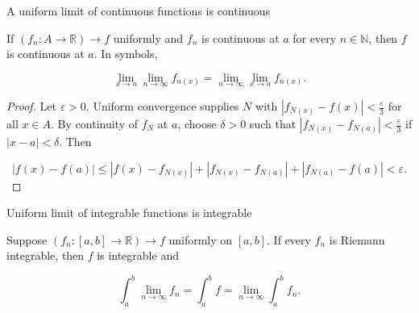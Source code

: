 \begin{theorem}{A uniform limit of continuous functions is continuous}

If \(\left( {f_{n}:A\rightarrow\mathbb{R}} \right)\rightarrow f\) uniformly and \(f_{n}\) is continuous at \(a\) for every \(n \in \mathbb{N}\), then \(f\) is continuous at \(a\). In symbols,

\[\lim\limits_{x\rightarrow a}\lim\limits_{n\rightarrow\infty}f_{n{(x)}} = \lim\limits_{n\rightarrow\infty}\lim\limits_{x\rightarrow a}f_{n{(x)}}.\]

\end{theorem}

\begin{proof}

Let \(\varepsilon > 0\). Uniform convergence supplies \(N\) with \(\left| {f_{N{(x)}} - f(x)} \right| < \frac{\varepsilon}{3}\) for all \(x \in A\). By continuity of \(f_{N}\) at \(a\), choose \(\delta > 0\) such that \(\left| {f_{N{(x)}} - f_{N{(a)}}} \right| < \frac{\varepsilon}{3}\) if \(\left| {x - a} \right| < \delta\). Then

\[\left| {f(x) - f(a)} \right| \leq \left| {f(x) - f_{N{(x)}}} \right| + \left| {f_{N{(x)}} - f_{N{(a)}}} \right| + \left| {f_{N{(a)}} - f(a)} \right| < \varepsilon.\]

\end{proof}

\begin{theorem}{Uniform limit of integrable functions is integrable}

Suppose \(\left( {f_{n}:\left\lbrack {a,b} \right\rbrack\rightarrow\mathbb{R}} \right)\rightarrow f\) uniformly on \(\left\lbrack {a,b} \right\rbrack\). If every \(f_{n}\) is Riemann integrable, then \(f\) is integrable and

\[\int_{a}^{b}\lim\limits_{n\rightarrow\infty}f_{n} = \int_{a}^{b}f = \lim\limits_{n\rightarrow\infty}\int_{a}^{b}f_{n}.\]

\end{theorem}

